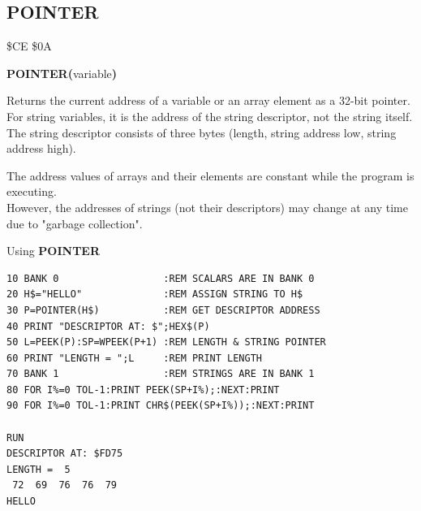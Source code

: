
\newpage
\subsection{POINTER}
\begin{description}[leftmargin=2cm,style=nextline]
\item [Token:] \$CE \$0A
\item [Format:] {\bf POINTER(}variable{\bf)}
\item [Usage:]  Returns the current address of a variable
                or an array element as a 32-bit pointer.
                For string variables, it is the address of
                the string descriptor, not the string itself.
                The string descriptor consists of three bytes
                (length, string address low, string address high).

\item [Remarks:] The address values of arrays and their elements
                 are constant while the program is executing. \\
                 However, the addresses of strings (not their descriptors)
                 may change at any time due to
                 "garbage collection".

\item [Example:] Using {\bf POINTER}

\begin{tcolorbox}[colback=black,coltext=white]
\verbatimfont{\codefont}
\begin{verbatim}
10 BANK 0                  :REM SCALARS ARE IN BANK 0
20 H$="HELLO"              :REM ASSIGN STRING TO H$
30 P=POINTER(H$)           :REM GET DESCRIPTOR ADDRESS
40 PRINT "DESCRIPTOR AT: $";HEX$(P)
50 L=PEEK(P):SP=WPEEK(P+1) :REM LENGTH & STRING POINTER
60 PRINT "LENGTH = ";L     :REM PRINT LENGTH
70 BANK 1                  :REM STRINGS ARE IN BANK 1
80 FOR I%=0 TOL-1:PRINT PEEK(SP+I%);:NEXT:PRINT
90 FOR I%=0 TOL-1:PRINT CHR$(PEEK(SP+I%));:NEXT:PRINT

RUN
DESCRIPTOR AT: $FD75
LENGTH =  5
 72  69  76  76  79
HELLO
\end{verbatim}
\end{tcolorbox}
\end{description}


\newpage
